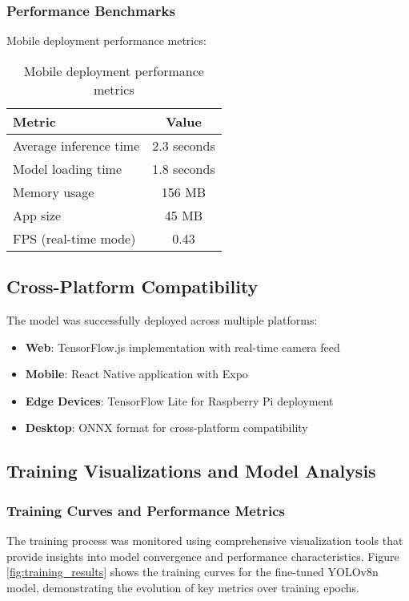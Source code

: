 \documentclass[12pt,a4paper]{article}
\begin{document}
\subsubsection{Performance Benchmarks}
Mobile deployment performance metrics:
\begin{table}[H]
\centering
\begin{tabular}{lc}
\toprule
\textbf{Metric} & \textbf{Value} \\
\midrule
Average inference time & 2.3 seconds \\
Model loading time & 1.8 seconds \\
Memory usage & 156 MB \\
App size & 45 MB \\
FPS (real-time mode) & 0.43 \\
\bottomrule
\end{tabular}
\caption{Mobile deployment performance metrics}
\label{tab:mobile_performance}
\end{table}

\subsection{Cross-Platform Compatibility}

The model was successfully deployed across multiple platforms:
\begin{itemize}
    \item \textbf{Web}: TensorFlow.js implementation with real-time camera feed
    \item \textbf{Mobile}: React Native application with Expo
    \item \textbf{Edge Devices}: TensorFlow Lite for Raspberry Pi deployment
    \item \textbf{Desktop}: ONNX format for cross-platform compatibility
\end{itemize}

\subsection{Training Visualizations and Model Analysis}

\subsubsection{Training Curves and Performance Metrics}
The training process was monitored using comprehensive visualization tools that provide insights into model convergence and performance characteristics. Figure \ref{fig:training_results} shows the training curves for the fine-tuned YOLOv8n model, demonstrating the evolution of key metrics over training epochs.
\end{document}
